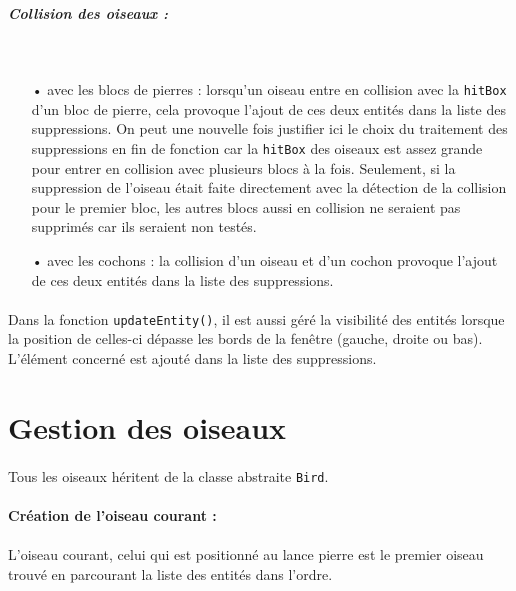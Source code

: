 \documentclass[a4paper,12pt]{report}
\begin{document}
\subparagraph{Collision des oiseaux :}
~\\
\begin{itemize}
\item[•] avec les blocs de pierres : lorsqu'un oiseau entre en collision avec la \verb+hitBox+ d'un bloc de pierre, cela provoque l'ajout de ces deux entités dans la liste des suppressions. On peut une nouvelle fois justifier ici le choix du traitement des suppressions en fin de fonction car la \verb+hitBox+ des oiseaux est assez grande pour entrer en collision avec plusieurs blocs à la fois. Seulement, si la suppression de l'oiseau était faite directement avec la détection de la collision pour le premier bloc, les autres blocs aussi en collision ne seraient pas supprimés car ils seraient non testés.
\item[•] avec les cochons : la collision d'un oiseau et d'un cochon provoque l'ajout de ces deux entités dans la liste des suppressions.
\end{itemize}

\paragraph{}Dans la fonction \verb+updateEntity()+, il est aussi géré la visibilité des entités lorsque la position de celles-ci dépasse les bords de la fenêtre (gauche, droite ou bas). L'élément concerné est ajouté dans la liste des suppressions.

\section{Gestion des oiseaux}

\paragraph{}Tous les oiseaux héritent de la classe abstraite \verb+Bird+. 

\paragraph{Création de l'oiseau courant :}

\paragraph{}L'oiseau courant, celui qui est positionné au lance pierre est le premier oiseau trouvé en parcourant la liste des entités dans l'ordre.
\end{document}
